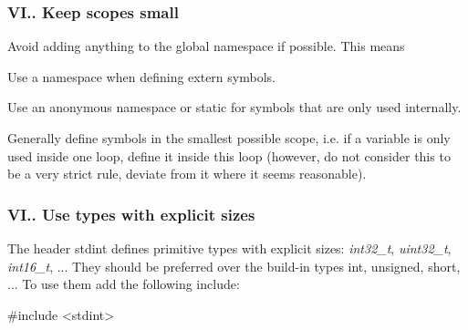 \subsubsection*{V\+I.. Keep scopes small}

Avoid adding anything to the global namespace if possible. This means


\begin{DoxyItemize}
\item Use a namespace when defining extern symbols.
\item Use an anonymous namespace or static for symbols that are only used internally.
\end{DoxyItemize}

Generally define symbols in the smallest possible scope, i.\+e. if a variable is only used inside one loop, define it inside this loop (however, do not consider this to be a very strict rule, deviate from it where it seems reasonable).

\subsubsection*{V\+I.. Use types with explicit sizes}

The header stdint defines primitive types with explicit sizes\+: {\itshape int32\+\_\+t}, {\itshape uint32\+\_\+t}, {\itshape int16\+\_\+t}, ... They should be preferred over the build-\/in types int, unsigned, short, ... To use them add the following include\+: 
\begin{DoxyCode}
\textcolor{preprocessor}{#include <stdint>}
\end{DoxyCode}
 